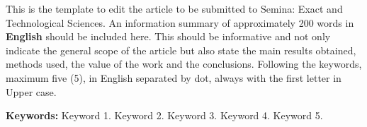\documentclass[article,10pt,twoside,a4paper,twocolumn,english,brazil]{abntex2}
\begin{document}
\captionsetup{format=plain,justification=justified,singlelinecheck=false} 

\frenchspacing

\pretextual
\SingleSpacing
\onecolumn

\maketitle
\vspace{-1.2cm}

\thispagestyle{firstpage}

\renewcommand{\resumoname}{\texorpdfstring{\fontsize{14pt}{16.8pt} \fontfamily{ptm} \selectfont \textbf{Abstract} \\[-0.3cm] \rule{0.91\textwidth}{0.5pt} \vspace{-0.5cm}}{Abstract}}
\begin{resumoumacoluna}
    \normalsize
	This is the template to edit the article to be submitted to Semina: Exact and Technological Sciences. An information summary of approximately 200 words in \textbf{English} should be included here. This should be informative and not only indicate the general scope of the article but also state the main results obtained, methods used, the value of the work and the conclusions.
Following the keywords, maximum five (5), in English separated by dot, always with the first letter in Upper case.
	
	\vspace{0.15cm}
    \noindent \textbf{Keywords:} Keyword 1. Keyword 2. Keyword 3. Keyword 4. Keyword 5. 	 
	
\end{resumoumacoluna}
\vspace{0.3cm}
\end{document}
